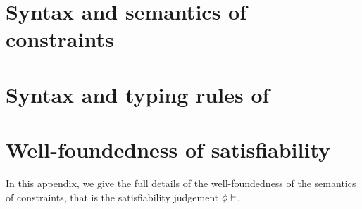 \documentclass[acmsmall,screen,nonacm]{acmart}
\begin{document}
\appendix

\section{Syntax and semantics of constraints}

\section{Syntax and typing rules of \OML}

\section{Well-foundedness of satisfiability}
\label{appendix:wf}

In this appendix, we give the full details of the well-foundedness of the
semantics of constraints, that is the satisfiability judgement $\phi \vdash \relax$.
\end{document}
